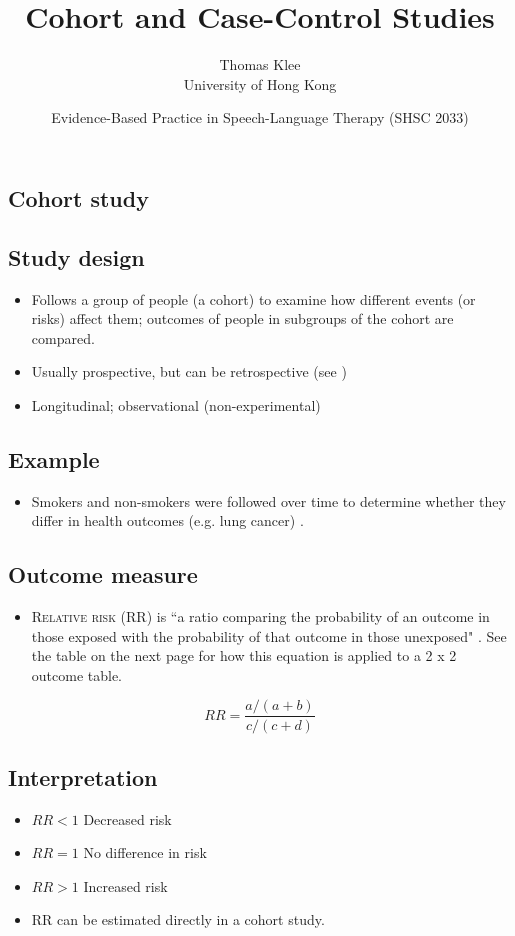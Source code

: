 \documentclass[a4paper]{article}
\title{Cohort and Case-Control Studies}
\author{Thomas Klee  \\ University of Hong Kong}
\date{Evidence-Based Practice in Speech-Language Therapy (SHSC 2033)}
\begin{document}
\maketitle

\begin{center}
\section*{Cohort study}
\end{center}

\subsection*{Study design} 
\begin{itemize}
\item[] Follows a group of people (a cohort) to examine how different events (or risks) affect them; outcomes of people in subgroups of the cohort are compared.
\item[] Usually prospective, but can be retrospective (see \citealp[pp. 118--120]{Ajetunmobi2002}) 
\item[] Longitudinal; observational (non-experimental)
\end{itemize}

\subsection*{Example}
\begin{itemize}
\item[] Smokers and non-smokers were followed over time to determine whether they differ in health outcomes (e.g. lung cancer) \citep{Doll1956}.
\end{itemize}

\subsection*{Outcome measure}
\begin{itemize}
\item[] \textsc{Relative risk} (RR) is ``a ratio comparing the probability of an outcome in those exposed with the probability of that outcome in those unexposed" \citep[p. 107]{Ajetunmobi2002}. See the table on the next page for how this equation is applied to a 2 x 2 outcome table.
\end{itemize}

$$RR = \frac{a / (a + b)}{c / (c + d)}$$ 

\subsection*{Interpretation}
\begin{itemize}
\item[] $RR < 1$	Decreased risk
\item[] $RR = 1$	No difference in risk
\item[] $RR > 1$	Increased risk
\item[] RR can be estimated directly in a cohort study.
\end{itemize}
\end{document}
